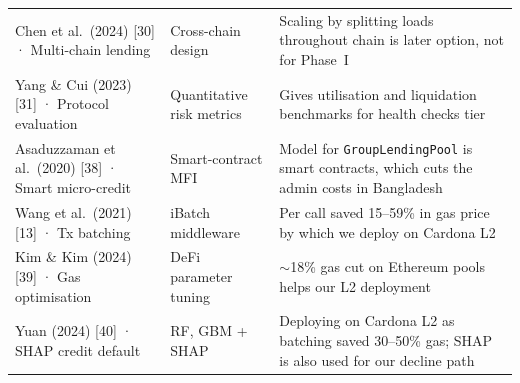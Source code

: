 \documentclass[12pt, a4paper]{report}
\begin{document}
\begin{table}[H]
{\begin{tabular}{@{}>{\raggedright\arraybackslash}p{3.0cm}>{\raggedright\arraybackslash}p{2.6cm}>{\raggedright\arraybackslash}p{6.8cm}@{}}
Chen et al.\ (2024) [30] · Multi-chain lending & Cross-chain design & Scaling by splitting loads throughout chain is later option, not for Phase~I \\
Yang \& Cui (2023) [31] · Protocol evaluation & Quantitative risk metrics & Gives utilisation and liquidation benchmarks for health checks tier \\
Asaduzzaman et al.\ (2020) [38] · Smart micro-credit & Smart-contract MFI & Model for \texttt{GroupLendingPool} is smart contracts, which cuts the admin costs in Bangladesh \\
Wang et al.\ (2021) [13] · Tx batching & iBatch middleware & Per call saved 15--59\% in gas price by which we deploy on Cardona L2 \\
Kim \& Kim (2024) [39] · Gas optimisation & DeFi parameter tuning & $\sim$18\% gas cut on Ethereum pools helps our L2 deployment \\
Yuan (2024) [40] · SHAP credit default & RF, GBM + SHAP & Deploying on Cardona L2 as batching saved 30--50\% gas; SHAP is also used for our decline path \\
\bottomrule
\end{tabular}%
}
\end{table}
\end{document}
